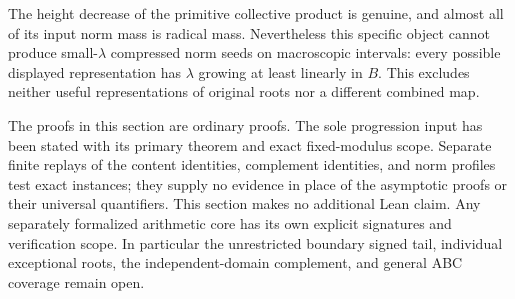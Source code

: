 The height decrease of the primitive collective product is genuine, and
almost all of its input norm mass is radical mass. Nevertheless this
specific object cannot produce small-\(\lambda\) compressed norm seeds
on macroscopic intervals: every possible displayed representation has
\(\lambda\) growing at least linearly in \(B\). This excludes neither
useful representations of original roots nor a different combined map.

The proofs in this section are ordinary proofs. The sole progression
input has been stated with its primary theorem and exact fixed-modulus
scope. Separate finite replays of the content identities, complement
identities, and norm profiles test exact instances; they supply no
evidence in place of the asymptotic proofs or their universal quantifiers.
This section makes no additional Lean claim. Any separately formalized
arithmetic core has its own explicit signatures and verification scope.
In particular the unrestricted boundary signed tail, individual exceptional
roots, the independent-domain complement, and general ABC coverage remain
open.
